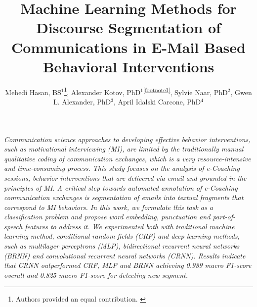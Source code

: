 \documentclass{amia}
\begin{document}
\title{Machine Learning Methods for Discourse Segmentation of Communications in E-Mail Based Behavioral Interventions}

\author{Mehedi Hasan, BS$^{1}$\footnote[1]{Authors provided an equal contribution. \label{footnote1}}, Alexander Kotov, PhD$^{1}$\textsuperscript{\ref{footnote1}}, Sylvie Naar, PhD$^{2}$, Gwen L. Alexander, PhD$^{3}$, April Idalski Carcone, PhD$^{4}$}


\maketitle

\textit{Communication science approaches to developing effective behavior interventions, such as motivational interviewing (MI), are limited by the traditionally manual qualitative coding of communication exchanges, which is a very resource-intensive and time-consuming process. This study focuses on the analysis of e-Coaching sessions, behavior interventions that are delivered via email and grounded in the principles of MI. A critical step towards automated annotation of e-Coaching communication exchanges is segmentation of emails into textual fragments that correspond to MI behaviors. In this work, we formulate this task as a classification problem and propose word embedding, punctuation and part-of-speech features to address it. We experimented both with traditional machine learning method, conditional random fields (CRF) and deep learning methods, such as multilayer perceptrons (MLP), bidirectional recurrent neural networks (BRNN) and convolutional recurrent neural networks (CRNN). Results indicate that CRNN outperformed CRF, MLP and BRNN achieving 0.989 macro F1-score overall and 0.825 macro F1-score for detecting new segment.}
\end{document}
